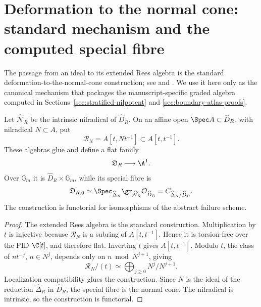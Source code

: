 \section{Deformation to the normal cone: standard mechanism and the computed special fibre}
\label{sec:rees-specialization-v127}

The passage from an ideal to its extended Rees algebra is the standard
deformation-to-the-normal-cone construction; see
\cite[\S5.1]{FultonIntersection} and
\cite[Tag 062Z]{StacksNormalCone}.  We use it here only as the
canonical mechanism that packages the manuscript-specific graded
algebra computed in Sections~\ref{sec:stratified-nilpotent} and
\ref{sec:boundary-atlas-proofs}.

\begin{proposition}
\label{prop:intrinsic-dnc-v127}
Let \(\widehat{\mathcal N}_R\) be the intrinsic nilradical of
\(\widehat D_R\).  On an affine open
\(\Spec A\subset\widehat D_R\), with nilradical \(N\subset A\), put
\[
 \mathscr R_N=A[t,Nt^{-1}]\subset A[t,t^{-1}].
\]
These algebras glue and define a flat family
\[
 \mathfrak D_R\longrightarrow\A^1.
\]
Over \(\mathbb G_m\) it is
\(\widehat D_R\times\mathbb G_m\), while its special fibre is
\[
 \mathfrak D_{R,0}
 \simeq
 \Spec_{\widehat\Delta_R}
 \gr_{\widehat{\mathcal N}_R}
 \mathcal O_{\widehat D_R}
 =
 C_{\widehat\Delta_R/\widehat D_R}.
\]
The construction is functorial for isomorphisms of the abstract
failure scheme.
\end{proposition}

\begin{proof}
The extended Rees algebra is the standard construction.  Multiplication
by \(t\) is injective because \(\mathscr R_N\) is a subring of
\(A[t,t^{-1}]\).  Hence it is torsion-free over the PID \(\C[t]\),
and therefore flat.  Inverting \(t\) gives
\(A[t,t^{-1}]\).  Modulo \(t\), the class of
\(n t^{-j}\), \(n\in N^j\), depends only on
\(n\bmod N^{j+1}\), giving
\[
 \mathscr R_N/(t)\simeq\bigoplus_{j\ge0}N^j/N^{j+1}.
\]
Localization compatibility glues the construction.  Since \(N\) is
the ideal of the reduction \(\widehat\Delta_R\) in
\(\widehat D_R\), the special fibre is the normal cone.  The
nilradical is intrinsic, so the construction is functorial.
\end{proof}

